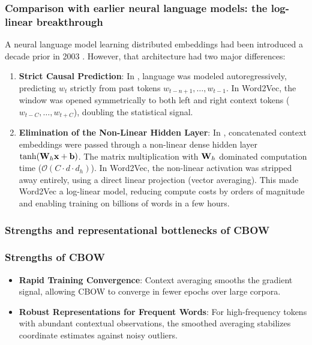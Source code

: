 \documentclass[../../main.tex]{subfiles}
\begin{document}
\subsubsection{Comparison with earlier neural language models: the log-linear breakthrough}
\label{subsec:bengio_vs_mikolov}

A neural language model learning distributed embeddings had been introduced a decade prior in 2003 \cite{bengio2003}. However, that architecture had two major differences:
\begin{enumerate}
    \item \textbf{Strict Causal Prediction}: In \cite{bengio2003}, language was modeled autoregressively, predicting $w_t$ strictly from past tokens $w_{t-n+1}, \dots, w_{t-1}$. In Word2Vec, the window was opened symmetrically to both left and right context tokens ($w_{t-C}, \dots, w_{t+C}$), doubling the statistical signal.
    \item \textbf{Elimination of the Non-Linear Hidden Layer}: In \cite{bengio2003}, concatenated context embeddings were passed through a non-linear dense hidden layer $\tanh(\mathbf{W}_h \mathbf{x} + \mathbf{b})$. The matrix multiplication with $\mathbf{W}_h$ dominated computation time ($\mathcal{O}(C \cdot d \cdot d_h)$). In Word2Vec, the non-linear activation was stripped away entirely, using a direct linear projection (vector averaging). This made Word2Vec a log-linear model, reducing compute costs by orders of magnitude and enabling training on billions of words in a few hours.
\end{enumerate}

\subsubsection{Strengths and representational bottlenecks of CBOW}
\label{subsec:cbow_bottlenecks}

\subsubsection{Strengths of CBOW}
\begin{itemize}
    \item \textbf{Rapid Training Convergence}: Context averaging smooths the gradient signal, allowing CBOW to converge in fewer epochs over large corpora.
    \item \textbf{Robust Representations for Frequent Words}: For high-frequency tokens with abundant contextual observations, the smoothed averaging stabilizes coordinate estimates against noisy outliers.
\end{itemize}
\end{document}
